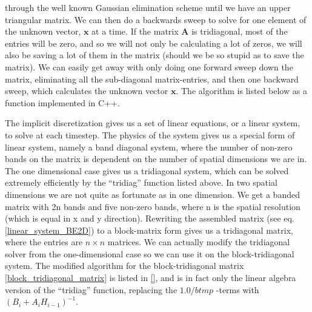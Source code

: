 through the well known Gaussian elimination scheme until we have an upper triangular matrix. We can then do a backwards sweep to solve for one element of the unknown vector, $\mathbf{x}$ at a time. If the matrix $\mathbf{A}$ is tridiagonal, most of the entries will be zero, and so we will not only be calculating a lot of zeros, we will also be saving a lot of them in the matrix (should we be so stupid as to save the matrix). We can easily get away with only doing one forward sweep down the matrix, eliminating all the sub-diagonal matrix-entries, and then one backward sweep, which calculates the unknown vector $\mathbf{x}$. The algorithm is listed below as a function implemented in C++.




The implicit discretization gives us a set of linear equations, or a linear system, to solve at each timestep. 
The physics of the system gives us a special form of linear system, namely a band diagonal system, where the number of non-zero bands on the matrix is dependent on the number of spatial dimensions we are in. 
The one dimensional case gives us a tridiagonal system, which can be solved extremely efficiently by the ``tridiag'' function listed above.
In two spatial dimensions we are not quite as fortunate as in one dimension. We get a banded matrix with 2n bands and five non-zero bands, where n is the spatial resolution (which is equal in x and y direction). 
Rewriting the assembled matrix (see eq. \ref{linear_system_BE2D}) to a block-matrix form gives us a tridiagonal matrix, where the entries are $n\times n$ matrices. 
We can actually modify the tridiagonal solver from the one-dimensional case so we can use it on the block-tridiagonal system. 
The modified algorithm for the block-tridiagonal matrix \ref{block_tridiagonal_matrix} is listed in \ref{}, and is in fact only the linear algebra version of the ``tridiag'' function, replacing the $1.0/btmp$ -terms with $\left(B_i+A_iH_{i-1}\right)^{-1}$. 

